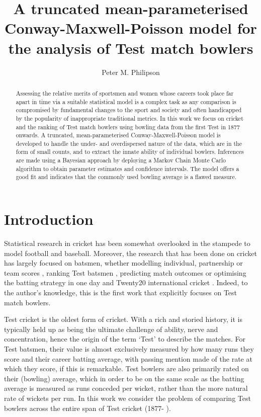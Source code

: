 \documentclass{statsoc}
\title[A truncated MPCMP model for the analysis of Test match bowlers]{A truncated mean-parameterised Conway-Maxwell-Poisson model for the analysis of Test match bowlers}
\author[P. M. Philipson]{Peter M. Philipson}
\begin{document}
 

\begin{abstract}
Assessing the relative merits of sportsmen and women whose careers took place far apart in time via a suitable statistical model  is a complex task as any comparison is compromised by fundamental changes to the sport and society and often handicapped by the popularity of inappropriate traditional metrics. In this work we focus on cricket and the ranking of Test match bowlers using bowling data from the first Test in 1877 onwards. A truncated, mean-parameterised Conway-Maxwell-Poisson model is developed to handle the under- and overdispersed nature of the data, which are in the form of small counts, and to extract the innate ability of individual bowlers. Inferences are made using a Bayesian approach by deploying a Markov Chain Monte Carlo algorithm to obtain parameter estimates and confidence intervals. The model offers a good fit and indicates that the commonly used bowling average is a flawed measure.
\end{abstract}


\section{Introduction}
Statistical research in cricket has been somewhat overlooked in the stampede to model football and baseball. Moreover, the research that has been done on cricket has largely focused on batsmen, whether modelling individual, partnership or team scores \citep{Kimber, Scarf2011, Pollard77}, ranking Test batsmen \citep{Brown2009, Rohde2011, Boys2019, Stevenson2021}, predicting match outcomes \citep{Davis2015} or optimising the batting strategy in one day and Twenty20 international cricket \citep{Preston2000, Swartz2006, Perera2016}. Indeed, to the author's knowledge, this is the first work that explicitly focuses on Test match bowlers.

Test cricket is the oldest form of cricket. With a rich and storied history, it is typically held up as being the ultimate challenge of ability, nerve and concentration, hence the origin of the term `Test' to describe the matches. For Test batsmen, their value is almost exclusively measured by how many runs they score and their career batting average, with passing mention made of the rate at which they score, if this is remarkable. Test bowlers are also primarily rated on their (bowling) average, which in order to be on the same scale as the batting average is measured as runs conceded per wicket, rather than the more natural rate of wickets per run.
In this work we consider the problem of comparing Test bowlers across the entire span of Test cricket (1877- ). 
\end{document}
